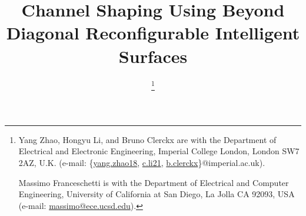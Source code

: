 \documentclass[journal]{IEEEtran}
\begin{document}
\title{Channel Shaping Using Beyond Diagonal Reconfigurable Intelligent Surfaces}
\author{
	\thanks{
		Yang Zhao, Hongyu Li, and Bruno Clerckx are with the Department of Electrical and Electronic Engineering, Imperial College London, London SW7 2AZ, U.K. (e-mail: \{\href{mailto:yang.zhao18@imperial.ac.uk}{yang.zhao18}, \href{mailto:c.li21@imperial.ac.uk}{c.li21}, \href{mailto:b.clerckx@imperial.ac.uk}{b.clerckx}\}@imperial.ac.uk).

		Massimo Franceschetti is with the Department of Electrical and Computer Engineering, University of California at San Diego, La Jolla CA 92093, USA (e-mail: \href{mailto:massimo@ece.ucsd.edu}{massimo@ece.ucsd.edu}).
	}
}
\maketitle
\end{document}
